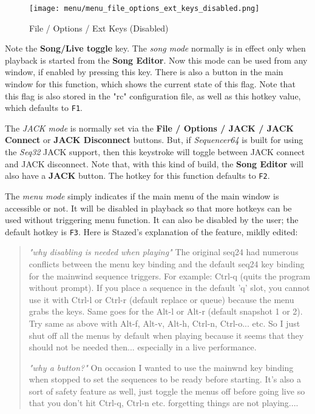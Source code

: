 \begin{figure}[H]
   \centering 
   \texttt{[image: menu/menu\_file\_options\_ext\_keys\_disabled.png]}
   \caption{File / Options / Ext Keys (Disabled)}
   \label{fig:seq64_menu_file_options_ext_keys_disabled}
\end{figure}

   Note the \textbf{Song/Live toggle} key.
   The \textsl{song mode} normally is in effect only when playback is started
   from the \textbf{Song Editor}.  Now this mode can be used from any
   window, if enabled by pressing this key.  There is also
   a button in the main window for this function, which shows the current state
   of this flag.  Note that this flag is also stored in the "rc" configuration
   file, as well as this hotkey value, which defaults to \texttt{F1}.

   The \textsl{JACK mode} is normally set via the
   \textbf{File / Options / JACK / JACK Connect} or 
   \textbf{JACK Disconnect} buttons.
   But, if \textsl{Sequencer64} is built for using the \textsl{Seq32} JACK
   support, then this keystroke will toggle between JACK connect and JACK
   disconnect.
   Note that, with this kind of build, the \textbf{Song Editor} will also have
   a \textbf{JACK} button.
   The hotkey for this function defaults to \texttt{F2}.

   The \textsl{menu mode} simply indicates if the main menu of the
   main window is accessible or not.  It will be disabled in playback
   so that more hotkeys can be used without triggering menu function.
   It can also be disabled by the user; the default hotkey is \texttt{F3}.
   Here is Stazed's explanation of the feature, mildly edited:

   \begin{quotation}
      \textsl{"why disabling is needed when playing"}
      The original seq24 had numerous conflicts between the menu key binding
      and the default seq24 key binding for the mainwind sequence triggers.
      For example: Ctrl-q (quits the program without prompt). If you place a
      sequence in the default 'q' slot, you cannot use it with Ctrl-l or Ctrl-r
      (default replace or queue) because the menu grabs the keys. Same goes for
      the Alt-l or Alt-r (default snapshot 1 or 2). Try same as above with
      Alt-f, Alt-v, Alt-h, Ctrl-n, Ctrl-o...  etc. So I just shut off all the
      menus by default when playing because it seems that they should not be
      needed then... especially in a live performance.

      \textsl{"why a button?"}
      On occasion I wanted to use the mainwnd key binding when stopped to set
      the sequences to be ready before starting. It's also a sort of safety
      feature as well, just toggle the menus off before going live so that you
      don't hit Ctrl-q, Ctrl-n etc. forgetting things are not playing....
   \end{quotation}

